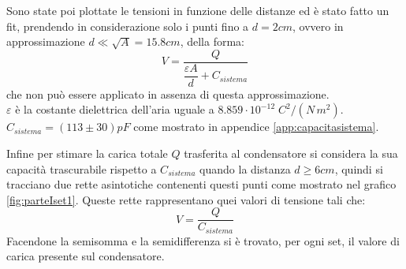 {Sono state poi plottate le tensioni in funzione delle distanze ed è stato fatto un fit, prendendo in considerazione solo i punti fino a $d = 2 cm$, ovvero in approssimazione $d \ll \sqrt{A} = 15.8 cm$, della forma: 
\begin{equation*}
    V = \dfrac{Q}{\dfrac{\varepsilon A}{d} + C_{sistema}}
\end{equation*} 
che non può essere applicato in assenza di questa approssimazione. 
\\
$\varepsilon$ è la costante dielettrica dell'aria uguale a $8.859 \cdot 10^{-12} \; C^2/(N \, m^2)$.
\\
$C_{sistema} = (113 \pm 30) pF$ come mostrato in appendice \ref{app:capacitasistema}.

Infine per stimare la carica totale $Q$ trasferita al condensatore si considera la sua capacità trascurabile rispetto a $C_{sistema}$ quando la distanza $d \geq 6 cm$, quindi si tracciano due rette asintotiche contenenti questi punti come mostrato nel grafico \ref{fig:parteIset1}. Queste rette rappresentano quei valori di tensione tali che: 
\begin{equation*}
    V = \dfrac{Q}{C_{sistema}} 
\end{equation*}
Facendone la semisomma e la semidifferenza si è trovato, per ogni set, il valore di carica presente sul condensatore.

\par}